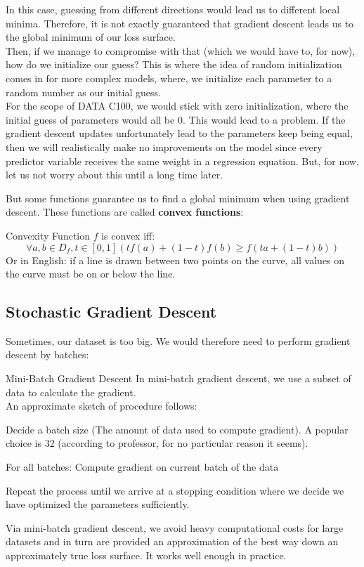 In this case, guessing from different directions would lead us to different local minima. Therefore, it is not exactly guaranteed that gradient descent leads us to the global minimum of our loss surface. \\
Then, if we manage to compromise with that (which we would have to, for now), how do we initialize our guess? This is where the idea of random initialization comes in for more complex models, where, we initialize each parameter to a random number as our initial guess. \\
For the scope of DATA C100, we would stick with zero initialization, where the initial guess of parameters would all be $0$. This would lead to a problem. If the gradient descent updates unfortunately lead to the parameters keep being equal, then we will realistically make no improvements on the model since every predictor variable receives the same weight in a regression equation. But, for now, let us not worry about this until a long time later.

But some functions guarantee us to find a global minimum when using gradient descent. These functions are called \textbf{convex functions}:
\begin{ln-define}{Convexity}{}
    Function $f$ is convex iff:
    \[\forall a, b \in D_f, t \in [0, 1] (tf(a) + (1 - t)f(b) \geq f(ta + (1 - t)b))\]
    Or in English: if a line is drawn between two points on the curve, all values on the curve must be on or below the line.
\end{ln-define}

\subsection{Stochastic Gradient Descent}
Sometimes, our dataset is too big. We would therefore need to perform gradient descent by batches:
\begin{ln-define}{Mini-Batch Gradient Descent}{}
    In mini-batch gradient descent, we use a subset of data to calculate the gradient. \\
    An approximate sketch of procedure follows:
    \begin{bindenum}
        \item Decide a batch size (The amount of data used to compute gradient). A popular choice is 32 (according to professor, for no particular reason it seems).
        \item For all batches:
        \subitem Compute gradient on current batch of the data
        \item Repeat the process until we arrive at a stopping condition where we decide we have optimized the parameters sufficiently.
    \end{bindenum}
\end{ln-define}
Via mini-batch gradient descent, we avoid heavy computational costs for large datasets and in turn are provided an approximation of the best way down an approximately true loss surface. It works well enough in practice.

